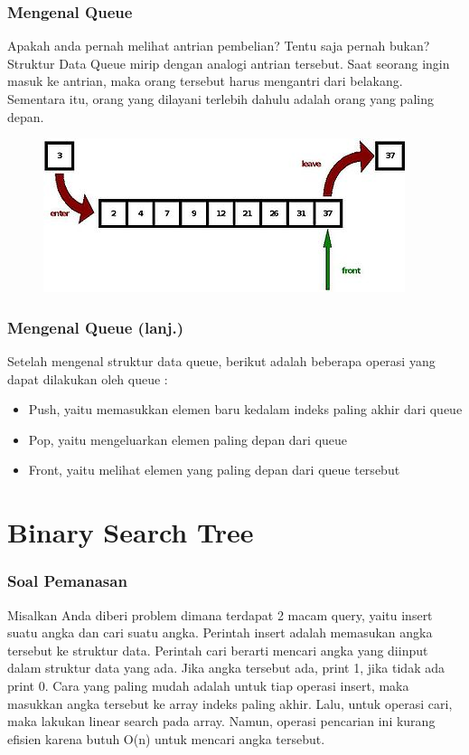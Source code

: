 \begin{frame}
\frametitle{Mengenal Queue}

Apakah anda pernah melihat antrian pembelian? Tentu saja pernah bukan?
\newline
\newline
Struktur Data Queue mirip dengan analogi antrian tersebut. Saat seorang ingin masuk ke antrian, maka orang tersebut harus mengantri dari belakang. Sementara itu, orang yang dilayani terlebih dahulu adalah orang yang paling depan.

\begin{figure}
	\centering
	\includegraphics[width=6 cm]{asset/queue.jpg}
\end{figure}
\end{frame}

\begin{frame}
\frametitle{Mengenal Queue (lanj.)}

Setelah mengenal struktur data queue, berikut adalah beberapa operasi yang dapat dilakukan oleh queue :
\begin{itemize}
	\item Push, yaitu memasukkan elemen baru kedalam indeks paling akhir dari queue
	\item Pop, yaitu mengeluarkan elemen paling depan dari queue
	\item Front, yaitu melihat elemen yang paling depan dari queue tersebut
\end{itemize}
\end{frame}

\section{Binary Search Tree}
\frame{\sectionpage}

\begin{frame}
\frametitle{Soal Pemanasan}
Misalkan Anda diberi problem dimana terdapat 2 macam query, yaitu insert suatu angka dan cari suatu angka. Perintah insert adalah memasukan angka tersebut ke struktur data. Perintah cari berarti mencari angka yang diinput dalam struktur data yang ada. Jika angka tersebut ada, print 1, jika tidak ada print 0.
\newline\newline
Cara yang paling mudah adalah untuk tiap operasi insert, maka masukkan angka tersebut ke array indeks paling akhir. Lalu, untuk operasi cari, maka lakukan linear search pada array. Namun, operasi pencarian ini kurang efisien karena butuh O(n) untuk mencari angka tersebut.
\end{frame}

